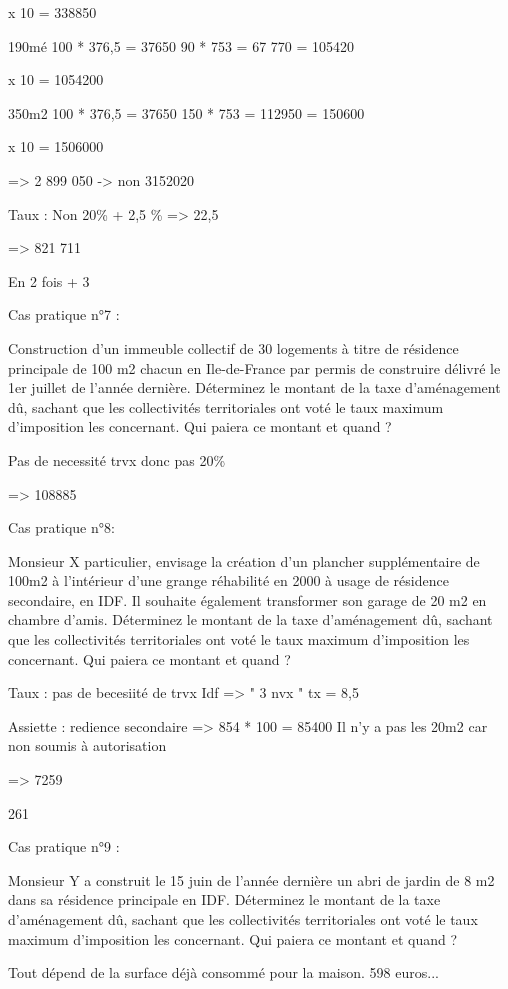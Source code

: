 			x 10 = 338850

		190mé
			100 * 376,5 = 37650
			90 * 753 = 67 770
				= 105420

				x 10 = 1054200

		350m2
		100 * 376,5 = 37650
		150 * 753 = 112950
			= 150600

			x 10 = 1506000

			=> 2 899 050 -> non 3152020

		Taux :
			Non 20\% + 2,5 \%
			=> 22,5

			=> 821 711

			En 2 fois + 3%

Cas pratique n°7 :

Construction d'un immeuble collectif de 30 logements à titre de résidence principale de 100 m2 chacun en Ile-de-France par permis de construire délivré le 1er juillet de l’année dernière.
Déterminez le montant de la taxe d’aménagement dû, sachant que les collectivités territoriales ont voté le taux maximum d’imposition les concernant.
Qui paiera ce montant et quand ?

	Pas de necessité trvx donc pas 20\%

	=> 108885

Cas pratique n°8:

Monsieur X particulier, envisage la création d’un plancher supplémentaire de 100m2 à l’intérieur d’une grange réhabilité en 2000 à usage de résidence secondaire, en IDF.
Il souhaite également transformer son garage de 20 m2 en chambre d’amis.
Déterminez le montant de la taxe d’aménagement dû, sachant que les collectivités territoriales ont voté le taux maximum d’imposition les concernant.
Qui paiera ce montant et quand ?

	Taux : pas de becesiité de trvx Idf => " 3 nvx " tx = 8,5

	Assiette : redience secondaire => 854 * 100 = 85400 Il n'y a pas les 20m2 car non soumis à autorisation

	=> 7259

	261


Cas pratique n°9 :

Monsieur Y a construit le 15 juin de l’année dernière un abri de jardin de 8 m2 dans sa résidence principale en IDF.
Déterminez le montant de la taxe d’aménagement dû, sachant que les collectivités territoriales ont voté le taux maximum d’imposition les concernant.
Qui paiera ce montant et quand ?

	Tout dépend de la surface déjà consommé pour la maison. 598 euros...


